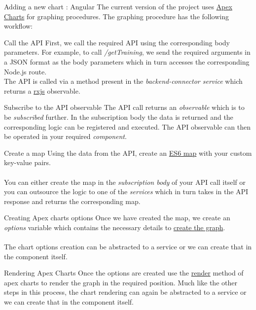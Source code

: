 \documentclass[
10pt, %
a4paper, %
oneside, %
headinclude,footinclude, %
BCOR5mm, %
]{scrartcl}
\begin{document}
\begin{section}{Adding a new chart : Angular}
The current version of the project uses \href{https://apexcharts.com/}{Apex Charts} for graphing procedures. The graphing procedure has the following workflow: 

\begin{subsection}{Call the API } 
First, we call the required API using the corresponding body parameters. For example, to call \textit{/getTraining}, we send the required arguments in a JSON format as the body parameters which in turn accesses the corresponding Node.js route. \\ 
The API is called via a method present in the \textit{backend-connector service} which returns a \href{https://rxjs.dev/}{rxjs} observable.
\end{subsection}
    
\begin{subsection}{Subscribe to the API observable } 
The API call returns an \textit{observable} which is to be \textit{subscribed} further. In the subscription body the data is returned and the corresponding logic can be registered and executed. The API observable can then be operated in your required \textit{component}. 
\end{subsection}
    
\begin{subsection}{Create a map} 
Using the data from the API, create an \href{https://developer.mozilla.org/en-US/docs/Web/JavaScript/Reference/Global_Objects/Array/map}{ES6 map} with your custom key-value pairs.\\ \\ You can either create the map in the \textit{subscription body} of your API call itself or you can outsource the logic to one of the \textit{services} which in turn takes in the API response and returns the corresponding map. 
\end{subsection}

\begin{subsection}{Creating Apex charts options}
Once we have created the map, we create an \textit{options} variable which contains the necessary details to \href{https://apexcharts.com/docs/creating-first-javascript-chart/}{create the graph}.\\ \\ The chart options creation can be abstracted to a service or we can create that in the component itself. 
\end{subsection} 

\begin{subsection}{Rendering Apex Charts }
Once the options are created use the \href{https://apexcharts.com/docs/methods/#render}{render} method of apex charts to render the graph in the required position. Much like the other steps in this process, the chart rendering can again be abstracted to a service or we can create that in the component itself. 
\end{subsection}
 

\newpage



\end{section}
\end{document}
